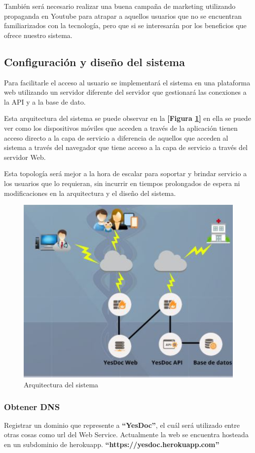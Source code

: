 \documentclass[a4paper,12pt]{article}
\begin{document}
También será necesario realizar una buena campaña de marketing utilizando propaganda en Youtube para atrapar a aquellos usuarios que no se encuentran familiarizados con la tecnología, pero que si se interesarán por los beneficios que ofrece nuestro sistema.

\subsection{Configuración y diseño del sistema}
Para facilitarle el acceso al usuario se implementará el sistema en una plataforma web utilizando un servidor diferente del servidor que gestionará las conexiones a la  API y a la base de dato.

Esta arquitectura del sistema se puede observar en la \textbf{[Figura \ref{esq_funcionamiento}]} en ella se puede ver como los dispositivos móviles que acceden a través de la aplicación tienen acceso directo a la capa de servicio a diferencia de aquellos que acceden al sistema a través del navegador que tiene acceso a la capa de servicio a través del servidor Web.

Esta topología será mejor a la hora de escalar para soportar y brindar servicio a los usuarios que lo requieran, sin incurrir en tiempos prolongados de espera ni modificaciones en la arquitectura y el diseño del sistema.


 \begin{figure}
  \centering
  \includegraphics[width=.8\textwidth]{img/esq_funcionamiento}
  \caption{Arquitectura del sistema}
  \label{esq_funcionamiento}
\end{figure}


\subsubsection{Obtener DNS}
Registrar un dominio que represente a \textbf{``YesDoc''}, el cuál será utilizado entre otras cosas como url del Web Service.
Actualmente la web se encuentra hosteada en un subdominio de herokuapp. \textbf{``https://yesdoc.herokuapp.com''}
\end{document}

